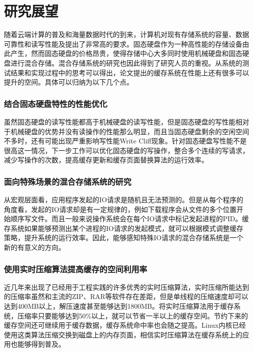 \section{研究展望}
\label{sec:thesis_expectation}
随着云端计算的普及和海量数据时代的到来，计算机对现有存储系统的容量、数据可靠性和读写性能及提出了非常高的要求。固态硬盘作为一种高性能的存储设备由此产生，然而固态硬盘的价格昂贵，使得存储中心大多同时使用机械硬盘和固态硬盘进行混合存储。混合存储系统的研究也因此得到了研究人员的重视。从系统的测试结果和实现过程中的思考可以得出，论文提出的缓存系统在性能上还有很多可以提升的空间。具体可以归纳为以下几个点。


\subsubsection{结合固态硬盘特性的性能优化}

虽然固态硬盘的读写性能都高于机械硬盘的读写性能，但是固态硬盘的写性能相对于机械硬盘的优势并没有读操作的性能那么明显，而且当固态硬盘剩余的空闲空间不多时，还有可能出现严重影响写性能Write Cliff现象。针对固态硬盘写性能不是很高这一情况，下一步工作可以优化固态硬盘的写操作，整合多个连续的写请求，减少写操作的次数，提高缓存更新和缓存页面替换算法的运行效率。

\subsubsection{面向特殊场景的混合存储系统的研究}

从宏观层面看，应用程序发起的IO请求是随机且无法预测的。但是从每个程序的角度看，发起的IO请求却是有一定规律的，例如下载程序会从文件的多个位置开始顺序写文件。而且一般来说操作系统会在每个IO请求中标记发起进程的PID。缓存系统如果能够预测出某个进程的IO请求的发起模式，就可以根据模式调整缓存策略，提升系统的运行效率。因此，能够感知特殊IO请求的混合存储系统是一个新的有意义的方向。

\subsubsection{使用实时压缩算法提高缓存的空间利用率}

近几年来出现了已经用于工程实践的许多优秀的实时压缩算法，实时压缩所能达到的压缩率虽然和主流的ZIP、RAR等软件存在差距，但是单线程的压缩速度却可以达到400MB以上，解压速度甚至能够达到1800MB。将实时压缩算法用于缓存系统，压缩率只要能够达到50\%以上，就可以节省一半以上的缓存空间。节约下来的缓存空间还可继续用于缓存数据，缓存系统命中率也会随之提高。Linux内核已经使用这类算法压缩交换到磁盘上的内存页面，相信实时压缩算法在缓存系统上的应用也能够得到普及。

